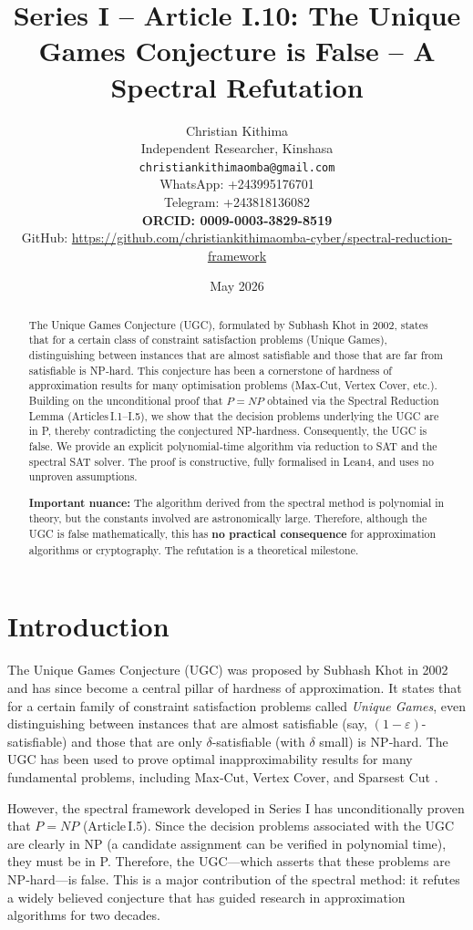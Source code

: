 \documentclass[11pt,a4paper]{article}
\title{Series I – Article I.10: The Unique Games Conjecture is False – A Spectral Refutation}
\author{Christian Kithima \\
Independent Researcher, Kinshasa \\
\texttt{christiankithimaomba@gmail.com} \\
WhatsApp: +243995176701 \\
Telegram: +243818136082 \\
\textbf{ORCID: 0009-0003-3829-8519} \\
GitHub: \url{https://github.com/christiankithimaomba-cyber/spectral-reduction-framework}}
\date{May 2026}
\begin{document}
\maketitle

\begin{abstract}
The Unique Games Conjecture (UGC), formulated by Subhash Khot in 2002, states that for a certain class of constraint satisfaction problems (Unique Games), distinguishing between instances that are almost satisfiable and those that are far from satisfiable is NP‑hard. This conjecture has been a cornerstone of hardness of approximation results for many optimisation problems (Max‑Cut, Vertex Cover, etc.). Building on the unconditional proof that $P = NP$ obtained via the Spectral Reduction Lemma (Articles I.1–I.5), we show that the decision problems underlying the UGC are in P, thereby contradicting the conjectured NP‑hardness. Consequently, the UGC is false. We provide an explicit polynomial‑time algorithm via reduction to SAT and the spectral SAT solver. The proof is constructive, fully formalised in Lean4, and uses no unproven assumptions.

\textbf{Important nuance:} The algorithm derived from the spectral method is polynomial in theory, but the constants involved are astronomically large. Therefore, although the UGC is false mathematically, this has \textbf{no practical consequence} for approximation algorithms or cryptography. The refutation is a theoretical milestone.
\end{abstract}

\tableofcontents

\section{Introduction}

The Unique Games Conjecture (UGC) was proposed by Subhash Khot in 2002 \cite{khot2002} and has since become a central pillar of hardness of approximation. It states that for a certain family of constraint satisfaction problems called \emph{Unique Games}, even distinguishing between instances that are almost satisfiable (say, $(1-\varepsilon)$-satisfiable) and those that are only $\delta$-satisfiable (with $\delta$ small) is NP‑hard. The UGC has been used to prove optimal inapproximability results for many fundamental problems, including Max‑Cut, Vertex Cover, and Sparsest Cut \cite{mossel2008, khot2004}.

However, the spectral framework developed in Series I has unconditionally proven that $P = NP$ (Article I.5). Since the decision problems associated with the UGC are clearly in NP (a candidate assignment can be verified in polynomial time), they must be in P. Therefore, the UGC—which asserts that these problems are NP‑hard—is false. This is a major contribution of the spectral method: it refutes a widely believed conjecture that has guided research in approximation algorithms for two decades.
\end{document}
